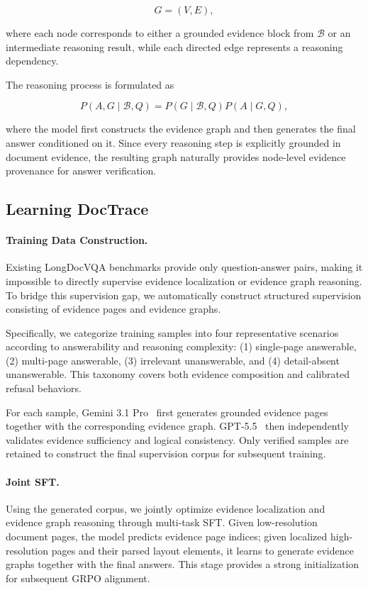 \documentclass[letterpaper]{article} %
\begin{document}
\[
G=(V,E),
\]

where each node corresponds to either a grounded evidence block from $\mathcal{B}$ or an intermediate reasoning result, while each directed edge represents a reasoning dependency.

The reasoning process is formulated as

\[
P(A,G\mid\mathcal{B},Q)
=
P(G\mid\mathcal{B},Q)
P(A\mid G,Q),
\]

where the model first constructs the evidence graph and then generates the final answer conditioned on it. Since every reasoning step is explicitly grounded in document evidence, the resulting graph naturally provides node-level evidence provenance for answer verification.

\subsection{Learning DocTrace}
\paragraph{Training Data Construction.}

Existing LongDocVQA benchmarks provide only question-answer pairs, making it impossible to directly supervise evidence localization or evidence graph reasoning. To bridge this supervision gap, we automatically construct structured supervision consisting of evidence pages and evidence graphs.

Specifically, we categorize training samples into four representative scenarios according to answerability and reasoning complexity: (1) single-page answerable, (2) multi-page answerable, (3) irrelevant unanswerable, and (4) detail-absent unanswerable. This taxonomy covers both evidence composition and calibrated refusal behaviors.

For each sample, Gemini 3.1 Pro~\cite{google2026gemini31pro} first generates grounded evidence pages together with the corresponding evidence graph. GPT-5.5~\cite{openai2026gpt55} then independently validates evidence sufficiency and logical consistency. Only verified samples are retained to construct the final supervision corpus for subsequent training.


\paragraph{Joint SFT.}

Using the generated corpus, we jointly optimize evidence localization and evidence graph reasoning through multi-task SFT. Given low-resolution document pages, the model predicts evidence page indices; given localized high-resolution pages and their parsed layout elements, it learns to generate evidence graphs together with the final answers. This stage provides a strong initialization for subsequent GRPO alignment.
\end{document}
